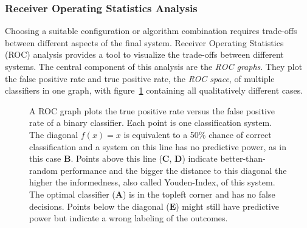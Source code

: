 \subsubsection{Receiver Operating Statistics Analysis}

Choosing a suitable configuration or algorithm combination requires trade-offs between different aspects of the final system.
Receiver Operating Statistics (ROC) analysis\cite{fawcett_2006} provides a tool to visualize the trade-offs between different systems.
The central component of this analysis are the \emph{ROC graphs}.
They plot the false positive rate and true positive rate, the \emph{ROC space}, of multiple classifiers in one graph, with figure~\ref{fig:roc_graph} containing all qualitatively different cases.
\begin{figure}[H]
\caption[The elements of a ROC graph]{A ROC graph plots the true positive rate versus the false positive rate of a binary classifier. Each point is one classification system. The diagonal $f(x) = x$ is equivalent to a 50\% chance of correct classification and a system on this line has no predictive power, as in this case $\mathbf{B}$. Points above this line ($\mathbf{C}$, $\mathbf{D}$) indicate better-than-random performance and the bigger the distance to this diagonal the higher the informedness, also called Youden-Index, of this system. The optimal classifier ($\mathbf{A}$) is in the topleft corner and has no false decisions. Points below the diagonal ($\mathbf{E}$) might still have predictive power but indicate a wrong labeling of the outcomes.}\label{fig:roc_graph}
\end{figure}

